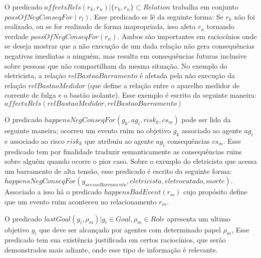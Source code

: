 O predicado $affectsRels(r_k,r_n) | \{ r_k, r_n\} \subset Relation $ trabalha em conjunto $possOfNegConseqFor(r_l)$. Esse predicado se lê da seguinte forma: Se $r_k$ não foi realizado, ou se for realizado de forma inapropriada, isso afeta  $r_n$ tornando verdade $possOfNegConseqFor(r_n)$. Ambos são importantes em raciocínios onde se deseja mostrar que a não execução de um dada relação não gera consequências negativas imediatas a ninguém, mas resulta em consequências futuras inclusive sobre pessoas que não compartilham da mesma situação. No exemplo do eletricista, a relação $relBastaoBarramento$ é afetada pela não execução da relação $relBastaoMedidor$ (que define a relação entre o aparelho medidor de corrente de fulga e o bastão isolante). Esse exemplo é escrito da seguinte maneira:$affectsRels(relBastaoMedidor,relBastaoBarramento)$

O predicado $happensNegConseqFor(g_k, ag_i,risk_k,cs_m)$ pode ser lido da seguinte maneira; ocorreu um evento ruim no objetivo $g_k$ associado ao agente $ag_i$ e associado ao risco $risk_k$ que atribuiu ao agente $ag_i$ consequências $cs_m$. Esse predicado tem por finalidade traduzir semanticamente as consequências ruins sobre alguém quando ocorre o pior caso. Sobre o exemplo do eletricista que acessa um barramento de alta tensão, esse predicado é escrito da seguinte forma: $happensNegConseqFor(g_{acessoBarramento}, eletricista,eletrocutado,morte)$. Associado a isso há o predicado $happensBadEvent(r_m)$ cujo propósito define que um evento ruim aconteceu no relacionamento $r_m$.

O predicado $lastGoal(g_i,\rho_m) | g_i \in Goal, \rho_m \in Role $ apresenta um ultimo objetivo $g_i$ que deve ser alcançado por agentes com determinado papel $\rho_m$, Esse predicado tem sua existência justificada em certos raciocínios, que serão demonstrados mais adiante, onde esse tipo de informação é relevante.